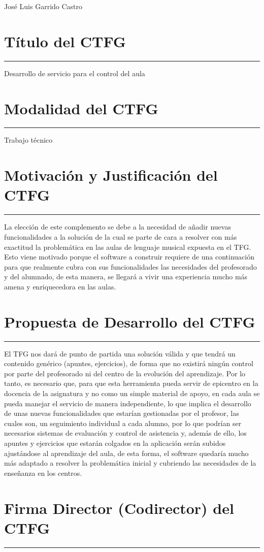 \documentclass[11pt]{article}  %
\newcommand{\subseccion}[1]{%
  \section*{\normalfont\Large\bfseries\color{blue}#1}{\color{blue}\vspace{-4mm}\hrule\vspace{4mm}}}
\begin{document}
José Luis Garrido Castro

\subseccion{Título del CTFG}

Desarrollo de servicio para el control del aula 

\subseccion{Modalidad del CTFG}

Trabajo técnico

\subseccion{Motivación y Justificación del CTFG}

La elección de este complemento se debe a la necesidad de añadir nuevas funcionalidades a la solución de la cual se parte de cara a resolver con más exactitud la problemática en las aulas de lenguaje musical expuesta en el TFG. Esto viene motivado porque el software a construir  requiere de una continuación para que realmente cubra con sus funcionalidades las necesidades del profesorado y del alumnado, de esta manera, se llegará a vivir una experiencia mucho más amena y enriquecedora en las aulas.




\subseccion{Propuesta de Desarrollo del CTFG}

El TFG nos dará de punto de partida una solución válida  y que tendrá un contenido  genérico (apuntes, ejercicios), de forma que no existirá ningún control por parte del profesorado ni del centro de la evolución del aprendizaje. Por lo tanto, es necesario que, para que esta herramienta pueda servir de epicentro en la docencia de la asignatura y no como un simple material de apoyo, en cada aula se pueda manejar el servicio de manera independiente, lo que implica el desarrollo de unas nuevas funcionalidades que estarían gestionadas por el profesor, las cuales son, un seguimiento individual a cada alumno, por lo que podrían ser necesarios sistemas de evaluación y control de asistencia y, además de ello, los apuntes y ejercicios que estarán colgados en la aplicación serán subidos ajustándose al aprendizaje del aula, de esta forma, el software quedaría mucho más adaptado a resolver la problemática inicial y cubriendo las necesidades de la enseñanza en los centros.



\subseccion{Firma Director (Codirector) del CTFG}
\end{document}
